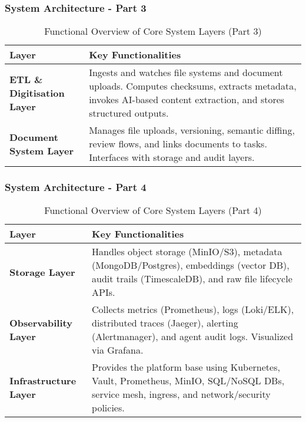 \begin{frame}
  \frametitle{System Architecture - Part 3}
 \begin{table}[h!]
\centering
\renewcommand{\arraystretch}{1.2}
\begin{tabular}{|p{3cm}|p{7cm}|}
\hline
\textbf{Layer} & \textbf{Key Functionalities} \\
\hline

\textbf{ETL \& Digitisation Layer} & 
Ingests and watches file systems and document uploads. Computes checksums, extracts metadata, invokes AI-based content extraction, and stores structured outputs. \\
\hline

\textbf{Document System Layer} & 
Manages file uploads, versioning, semantic diffing, review flows, and links documents to tasks. Interfaces with storage and audit layers. \\
\hline

\end{tabular}
\caption{Functional Overview of Core System Layers (Part 3)}
\end{table}
\end{frame}

\begin{frame}
  \frametitle{System Architecture - Part 4}
 \begin{table}[h!]
\centering
\renewcommand{\arraystretch}{1.2}
\begin{tabular}{|p{3cm}|p{7cm}|}
\hline
\textbf{Layer} & \textbf{Key Functionalities} \\
\hline

\textbf{Storage Layer} & 
Handles object storage (MinIO/S3), metadata (MongoDB/Postgres), embeddings (vector DB), audit trails (TimescaleDB), and raw file lifecycle APIs. \\
\hline

\textbf{Observability Layer} & 
Collects metrics (Prometheus), logs (Loki/ELK), distributed traces (Jaeger), alerting (Alertmanager), and agent audit logs. Visualized via Grafana. \\
\hline

\textbf{Infrastructure Layer} & 
Provides the platform base using Kubernetes, Vault, Prometheus, MinIO, SQL/NoSQL DBs, service mesh, ingress, and network/security policies. \\
\hline

\end{tabular}
\caption{Functional Overview of Core System Layers (Part 4)}
\end{table}
\end{frame}
